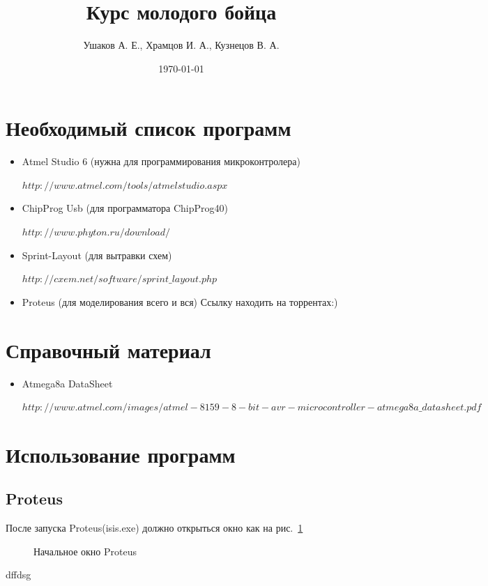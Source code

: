 \documentclass[12pt]{article}
\title{Курс молодого бойца}
\author{Ушаков А. Е., Храмцов И. А., Кузнецов В. А.}
\date{\today}
\begin{document}
\maketitle


\newpage
\tableofcontents
\newpage
\section{Необходимый список программ}
\begin{itemize}
\item Atmel Studio 6 (нужна для программирования микроконтролера) 

$http://www.atmel.com/tools/atmelstudio.aspx$
\item ChipProg Usb (для программатора ChipProg40) 

$http://www.phyton.ru/download/$
\item Sprint-Layout (для вытравки схем)

$http://cxem.net/software/sprint\_layout.php$
\item Proteus (для моделирования всего и вся) Ссылку находить на торрентах:)
\end{itemize}
\section{Справочный материал}
\begin{itemize}
\item Atmega8a DataSheet 

$http://www.atmel.com/images/atmel-8159-8-bit-avr-microcontroller-atmega8a\_datasheet.pdf$
\end{itemize}






\section{Использование программ}
\subsection{Proteus}
После запуска Proteus(isis.exe) должно открыться окно как на рис.~\ref{p1} 


\begin{figure}[h]
\caption{Начальное окно Proteus}
\label{p1}
\end{figure}
dffdsg
\end{document}

